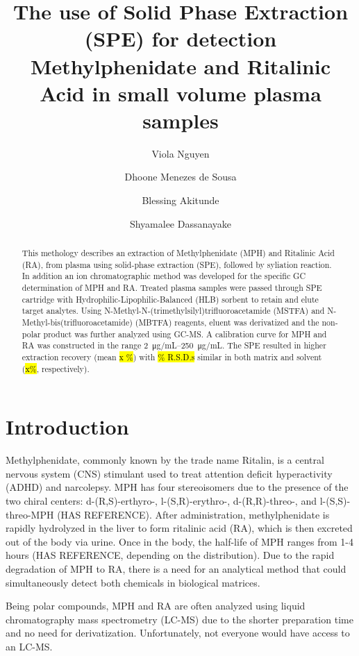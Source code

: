 \documentclass[journal=jacsat,manuscript=article]{achemso}
\author{Viola Nguyen}
\author{Dhoone Menezes de Sousa}
\author{Blessing Akitunde}
\author{Shyamalee Dassanayake}
\affiliation{Icahn School of Medicine}
\title{The use of Solid Phase Extraction (SPE) for detection Methylphenidate and Ritalinic Acid in small volume plasma samples }
\begin{document}
\begin{abstract}
This methology describes an extraction of Methylphenidate (MPH) and Ritalinic Acid (RA), from plasma using solid-phase extraction (SPE), followed by syliation reaction. In addition an ion chromatographic method was developed for the specific GC determination of MPH and RA.  Treated plasma samples were passed through SPE cartridge with Hydrophilic-Lipophilic-Balanced (HLB) sorbent to retain and elute target analytes. Using N-Methyl-N-(trimethylsilyl)trifluoroacetamide (MSTFA) and N-Methyl-bis(trifluoroacetamide) (MBTFA) reagents, eluent was derivatized and the non-polar product was further analyzed using GC-MS. A calibration curve for MPH and RA was constructed in the range  \SIrange[range-units = brackets]{2}{250}{\micro \gram/mL}. The SPE resulted in higher extraction recovery (mean \hl  {x \%}) with \hl {\% R.S.D.s} similar in both matrix and solvent (\hl {x\%}, respectively).

\end{abstract}
\section{Introduction}
Methylphenidate, commonly known by the trade name Ritalin\textsuperscript{\textregistered}, is a central nervous system (CNS) stimulant used to treat attention deficit hyperactivity (ADHD) and narcolepsy.  MPH has four stereoisomers due to the presence of the two chiral centers: d-(R,S)-erthyro-, l-(S,R)-erythro-, d-(R,R)-threo-, and l-(S,S)-threo-MPH (HAS REFERENCE).  After administration, methylphenidate is rapidly hydrolyzed in the liver to form ritalinic acid (RA), which is then excreted out of the body via urine.  Once in the body, the half-life of MPH ranges from 1-4 hours (HAS REFERENCE, depending on the distribution). Due to the rapid degradation of MPH to RA, there is a need for an analytical method that could simultaneously detect both chemicals in biological matrices. 

Being polar compounds, MPH and RA are often analyzed using liquid chromatography mass spectrometry (LC-MS) due to the shorter preparation time and no need for derivatization. Unfortunately, not everyone would have access to an LC-MS. 
\end{document}
